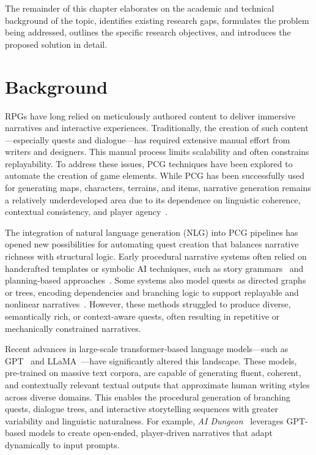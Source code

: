 The remainder of this chapter elaborates on the academic and technical background
of the topic, identifies existing research gaps, formulates the problem being addressed,
outlines the specific research objectives, and introduces the proposed solution in detail.

\section{Background}

RPGs have long relied on meticulously authored content to deliver immersive narratives
and interactive experiences. Traditionally, the creation of such content—especially quests
and dialogue—has required extensive manual effort from writers and designers. This
manual process limits scalability and often constrains replayability. To address these
issues, PCG techniques have been explored to automate the creation of game elements.
While PCG has been successfully used for generating maps, characters, terrains, and
items, narrative generation remains a relatively underdeveloped area due to its dependence
on linguistic coherence, contextual consistency, and player agency~\cite{togelius2013procedural}.

The integration of natural language generation (NLG) into PCG pipelines has opened
new possibilities for automating quest creation that balances narrative richness with structural
logic. Early procedural narrative systems often relied on handcrafted templates or
symbolic AI techniques, such as story grammars~\cite{black1979evaluation} and planning-based approaches~\cite{riedl2013interactive}.
Some systems also model quests as directed graphs or trees, encoding dependencies and
branching logic to support replayable and nonlinear narratives~\cite{hendrikx2013procedural}. However, these methods
struggled to produce diverse, semantically rich, or context-aware quests, often resulting
in repetitive or mechanically constrained narratives.

Recent advances in large-scale transformer-based language models—such as GPT~\cite{brown2020language}
and LLaMA~\cite{touvron2023llama}—have significantly altered this landscape. These models, pre-trained
on massive text corpora, are capable of generating fluent, coherent, and contextually
relevant textual outputs that approximate human writing styles across diverse domains.
This enables the procedural generation of branching quests, dialogue trees, and interactive
storytelling sequences with greater variability and linguistic naturalness. For example, \textit{AI Dungeon}~\cite{ai-dungeon}
leverages GPT-based models to create open-ended, player-driven narratives
that adapt dynamically to input prompts.

